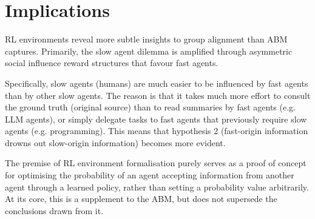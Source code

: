 \documentclass{article}
\begin{document}
\section{Implications}

RL environments reveal more subtle insights to group alignment than ABM captures. Primarily, the slow agent dilemma is amplified through asymmetric social influence reward structures that favour fast agents. 

Specifically, slow agents (humans) are much easier to be influenced by fast agents than by other slow agents. The reason is that it takes much more effort to consult the ground truth (original source) than to read summaries by fast agents (e.g. LLM agents), or simply delegate tasks to fast agents that previously require slow agents (e.g. programming). This means that hypothesis 2 (fast-origin information drowns out slow-origin information) becomes more evident. 

The premise of RL environment formalisation purely serves as a proof of concept for optimising the probability of an agent accepting information from another agent through a learned policy, rather than  setting a probability value arbitrarily. At its core, this is a supplement to the ABM, but does not supersede the conclusions drawn from it. 

\printbibliography
\end{document}
